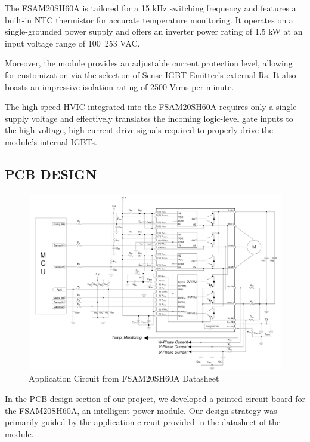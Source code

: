 The FSAM20SH60A is tailored for a 15 kHz switching frequency and features a built-in NTC thermistor for accurate temperature monitoring. It operates on a single-grounded power supply and offers an inverter power rating of 1.5 kW at an input voltage range of 100~253 VAC. 

Moreover, the module provides an adjustable current protection level, allowing for customization via the selection of Sense-IGBT Emitter's external Rs. It also boasts an impressive isolation rating of 2500 Vrms per minute. 

The high-speed HVIC integrated into the FSAM20SH60A requires only a single supply voltage and effectively translates the incoming logic-level gate inputs to the high-voltage, high-current drive signals required to properly drive the module's internal IGBTs. 



\subsection{PCB DESIGN}

\begin{figure}[H]
	\includegraphics[width=6in]{sections/section4/images/PCBDesign/ApplicationCircuitfromDatasheet.png}
	\caption{Application Circuit from FSAM20SH60A Datasheet}
\end{figure}

In the PCB design section of our project, we developed a printed circuit board for the FSAM20SH60A, an intelligent power module. Our design strategy was primarily guided by the application circuit provided in the datasheet of the module. 

